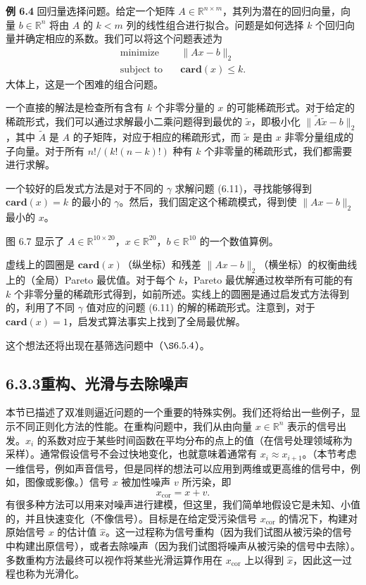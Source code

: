 \documentclass[UTF8, 12pt, fontset=fandol, oneside]{ctexart}
\begin{document}
\noindent\textbf{例 6.4}\quad
回归量选择问题。给定一个矩阵 $A\in\mathbb{R}^{n\times m}$，其列为潜在的回归向量，向量 $b\in\mathbb{R}^n$ 将由 $A$ 的 $k<m$ 列的线性组合进行拟合。问题是如何选择 $k$ 个回归向量并确定相应的系数。我们可以将这个问题表述为
\[
\begin{aligned}
\text{minimize}\quad & \|Ax-b\|_2\\
\text{subject to}\quad & \mathbf{card}(x)\leq k.
\end{aligned}
\]
大体上，这是一个困难的组合问题。

一个直接的解法是检查所有含有 $k$ 个非零分量的 $x$ 的可能稀疏形式。对于给定的稀疏形式，我们可以通过求解最小二乘问题得到最优的 $\tilde{x}$，即极小化 $\|\tilde{A}\tilde{x}-b\|_2$，其中 $\tilde{A}$ 是 $A$ 的子矩阵，对应于相应的稀疏形式，而 $\tilde{x}$ 是由 $x$ 非零分量组成的子向量。对于所有 $n!/(k!(n-k)!)$ 种有 $k$ 个非零量的稀疏形式，我们都需要进行求解。

一个较好的启发式方法是对于不同的 $\gamma$ 求解问题 (6.11)，寻找能够得到 $\mathbf{card}(x)=k$ 的最小的 $\gamma$。然后，我们固定这个稀疏模式，得到使 $\|Ax-b\|_2$ 最小的 $x$。

图 6.7 显示了 $A\in\mathbb{R}^{10\times 20}$，$x\in\mathbb{R}^{20}$，$b\in\mathbb{R}^{10}$ 的一个数值算例。

虚线上的圆圈是 $\mathbf{card}(x)$（纵坐标）和残差 $\|Ax-b\|_2$（横坐标）的权衡曲线上的（全局）Pareto 最优值。对于每个 $k$，Pareto 最优解通过枚举所有可能的有 $k$ 个非零分量的稀疏形式得到，如前所述。实线上的圆圈是通过启发式方法得到的，利用了不同 $\gamma$ 值对应的问题 (6.11) 的解的稀疏形式。注意到，对于 $\mathbf{card}(x)=1$，启发式算法事实上找到了全局最优解。

这个想法还将出现在基筛选问题中（$\S 6.5.4$）。

\subsection*{6.3.3\quad 重构、光滑与去除噪声}

本节已描述了双准则逼近问题的一个重要的特殊实例。我们还将给出一些例子，显示不同正则化方法的性能。在重构问题中，我们从由向量 $x\in\mathbb{R}^n$ 表示的信号出发。$x_i$ 的系数对应于某些时间函数在平均分布的点上的值（在信号处理领域称为采样）。通常假设信号不会过快地变化，也就意味着通常有 $x_i\approx x_{i+1}$。（本节考虑一维信号，例如声音信号，但是同样的想法可以应用到两维或更高维的信号中，例如，图像或影像。）信号 $x$ 被加性噪声 $v$ 所污染，即
\[
x_{\mathrm{cor}}=x+v.
\]
有很多种方法可以用来对噪声进行建模，但这里，我们简单地假设它是未知、小值的，并且快速变化（不像信号）。目标是在给定受污染信号 $x_{\mathrm{cor}}$ 的情况下，构建对原始信号 $x$ 的估计值 $\hat{x}$。这一过程称为信号重构（因为我们试图从被污染的信号中构建出原信号），或者去除噪声（因为我们试图将噪声从被污染的信号中去除）。多数重构方法最终可以视作将某些光滑运算作用在 $x_{\mathrm{cor}}$ 上以得到 $\hat{x}$，因此这一过程也称为光滑化。
\end{document}
